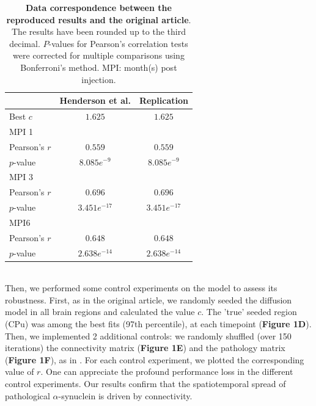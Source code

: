 \begin{table}[ht]
  \begin{center}
    \centering
    
    \begin{tabular}{|l|c|c|} %
      \hline
      
      &\textbf{Henderson et al.} & \textbf{Replication} \hspace{1cm}\\

      \hline
      Best  $c$  & $1.625$ & $1.625$ \\
      MPI 1 & &\\
            \hspace{1cm} Pearson's $r$ & $0.559$ & $0.559$\\
            \hspace{1cm} $p$-value & $8.085e^{-9}$ & $8.085e^{-9}$ \\ 
      MPI 3& &\\
            \hspace{1cm} Pearson's $r$ & $0.696$ & $0.696$ \\
            \hspace{1cm} $p$-value & $3.451e^{-17}$ &  $3.451e^{-17}$ \\ 
       
      MPI6& &\\
            \hspace{1cm} Pearson's $r$ & $0.648$ & $0.648$ \\
            \hspace{1cm} $p$-value & $2.638e^{-14}$& $2.638e^{-14}$ \\ 
      \hline
      
    \end{tabular}
    \caption{\textbf{Data correspondence between the reproduced results and the original article}. The results have been rounded up to the third decimal. $P$-values for Pearson's correlation tests were corrected for multiple comparisons using Bonferroni's method. MPI: month(s) post injection.}
  \end{center}
\end{table}

\\
Then, we performed some control experiments on the model to assess its robustness. First, as in the original article, we randomly seeded the diffusion model in all brain regions and calculated the value $c$. The 'true' seeded region (CPu) was among the best fits (97th percentile), at each timepoint (\textbf{Figure 1D}). Then, we implemented 2 additional controls: we randomly shuffled (over 150 iterations) the connectivity matrix (\textbf{Figure 1E}) and the pathology matrix (\textbf{Figure 1F}), as in \cite{Pandya_2017}. For each control experiment, we plotted the corresponding value of $r$. One can appreciate the profound performance loss in the different control experiments. Our results confirm that the spatiotemporal spread of pathological $\alpha$-synuclein is driven by connectivity.

